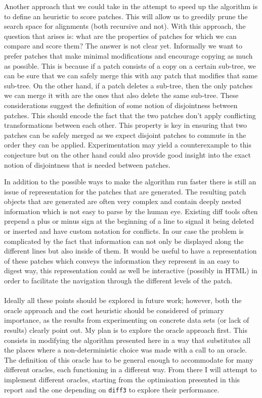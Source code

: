 \documentclass[11pt]{article}
\begin{document}
Another approach that we could take in the attempt to speed up the algorithm is to define an heuristic to score
patches. This will allow us to greedily prune the search space for 
alignments (both recursive and not). With this approach, the question that arises is: what are the properties of patches 
for which we can compare and score them? The answer is not clear yet. Informally we want to prefer patches that make 
minimal modifications and encourage copying as much as possible. This is because 
if a patch consists of a copy on a certain sub-tree, we can be sure that we can 
safely merge this with any patch that modifies that same sub-tree. On the 
other hand, if a patch deletes a sub-tree, then the only patches we can merge 
it with are the ones that also delete the same sub-tree.
These considerations suggest the definition of some notion of disjointness between patches. This should 
encode the fact that the two patches don't apply conflicting transformations 
between each other. This property is key in ensuring that two patches can be safely merged as we expect 
disjoint patches to commute in the order they can be applied. Experimentation may yield a counterexample to this conjecture but 
on the other hand could also provide good insight into the exact notion of disjointness that is needed between patches.

In addition to the possible ways to make the algorithm run faster there is still an issue of representation for
the patches that are generated. 
The resulting patch objects that are generated are often very complex and contain deeply nested information which is 
not easy to parse by the human eye. 
Existing diff tools often prepend a  plus or minus sign at the beginning of a line to signal it being deleted or 
inserted and have custom notation for conflicts. In our case the problem is 
complicated by the fact that information can not only be displayed along the 
different lines but also inside of them. 
It would be useful to have a representation of these patches which conveys the information 
they represent in an easy to digest way, this representation could as well be 
interactive (possibly in HTML) in order to facilitate the navigation through the 
different levels of the patch.
\\\\
Ideally all these points should be explored in future work; however, both the oracle approach and the cost heuristic should 
be considered of primary importance, as the results from experimenting on 
concrete data sets (or lack of results) clearly point out. 
My plan is to explore the oracle approach first. This consists in modifying the 
algorithm presented here in a way that substitutes all the places where a 
non-deterministic choice was made with a call to an oracle. The definition of 
this oracle has to be general enough to accommodate for many different oracles, 
each functioning in a different way. From there I will attempt to implement 
different oracles, starting from the optimisation presented in this report and 
the one depending on \texttt{diff3} to explore their performance. 
\end{document}
